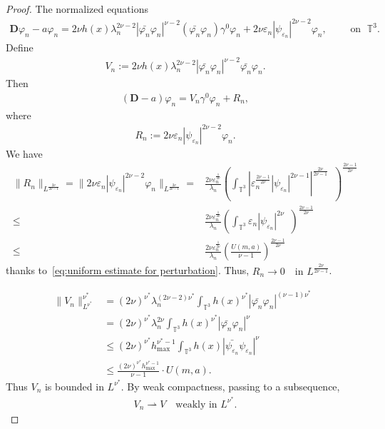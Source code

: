 \documentclass[10pt,a4paper]{amsart}
\newcommand{\T}{\mathbb{T}}
\newcommand{\dd}{\mathop{}\!\mathrm{d}}
\DeclareMathOperator{\dv}{\dd{vol}}
\newcommand{\eps}{\varepsilon}
\newcommand{\pD}{\mathbf{D}}
\newcommand{\parenthesis}[1]{\left(#1\right)} %
\begin{document}
\begin{proof}
The normalized equations
\begin{align}\label{eq:normalized eqn}
    \pD\varphi_n-a\varphi_n=2\nu h(x)\lambda_n^{2\nu-2}|\bar{\varphi_n}\varphi_n|^{\nu-2}(\bar{\varphi_n}\varphi_n)\gamma^0\varphi_n + 2\nu\eps_n |\psi_{\eps_n}|^{2\nu -2 }\varphi_n, \qquad \mbox{ on } \; \T^3.
\end{align}
Define
\begin{align}
V_n
:=
2\nu h(x)\lambda_n^{2\nu-2}
\left|\bar{\varphi_n}\varphi_n\right|^{\nu-2}\bar{\varphi_n}\varphi_n.
\end{align}
Then
\begin{align}
(\pD-a)\varphi_n
=
V_n
\gamma^0\varphi_n
+
R_n,
\end{align}
where
\begin{align}
R_n
:=
2\nu\eps_n
|\psi_{\eps_n}|^{2\nu-2}\varphi_n.
\end{align}
We have
\begin{align}
   \|R_n\|_{L^{\frac{2\nu}{2\nu -1}}}=\|2\nu\eps_n |\psi_{\eps_n}|^{2\nu -2 }\varphi_n \|_{L^{\frac{2\nu}{2\nu -1}}}
    = & \frac{2\nu \eps_n^{\frac{1}{2\nu}} }{\lambda_n}
     \parenthesis{ \int_{\T^3} \left|\eps_n^{\frac{2\nu-1}{2\nu}} |\psi_{\eps_n}|^{2\nu -1} \right|^{\frac{2\nu}{2\nu-1}} \dv   }^{\frac{2\nu-1}{2\nu}}\\
    \leq& \frac{2\nu \eps_n^{\frac{1}{2\nu}} }{\lambda_n}
    \parenthesis{ \int_{\T^3} \eps_n |\psi_{\eps_n}|^{2\nu}\dv}^{\frac{2\nu-1}{2\nu}} \\
    \leq& \frac{2\nu \eps_n^{\frac{1}{2\nu}} }{\lambda_n}\parenthesis{ \frac{U(m,a)}{\nu-1} }^{\frac{2\nu-1}{2\nu}}
\end{align}
thanks to~\eqref{eq:uniform estimate for perturbation}.
 Thus, $R_n\to0
\quad\text{in }L^{\frac{2\nu}{2\nu-1}}$.




\begin{align}
\|V_n\|^{\nu^*}_{L^{\nu^*}}&=(2\nu)^{\nu^*}\lambda_n^{(2\nu-2)\nu^*}\int_{\T^3}h(x)^{\nu^*}|\bar{\varphi_n}\varphi_n|^{(\nu-1)\nu^*}\dv\\
&=(2\nu)^{\nu^*}\lambda_n^{2\nu}\int_{\T^3}h(x)^{\nu^*}|\bar{\varphi_n}\varphi_n|^{\nu}\dv\\
&\leq (2\nu)^{\nu^*}h_{\max}^{\nu^*-1}\int_{\T^3}h(x)|\bar{\psi_{\eps_n}}\psi_{\eps_n}|^{\nu}\dv\\
&\leq \frac{(2\nu)^{\nu^*}h_{\max}^{\nu^*-1}}{\nu-1}\cdot U(m,a).
\end{align}
Thus ${V_n}$ is bounded in $L^{\nu^*}$. By weak compactness, passing to a subsequence,
\begin{align}
V_n\rightharpoonup V
\quad\text{weakly in }L^{\nu^*}.
\end{align}


\end{proof}
\end{document}
